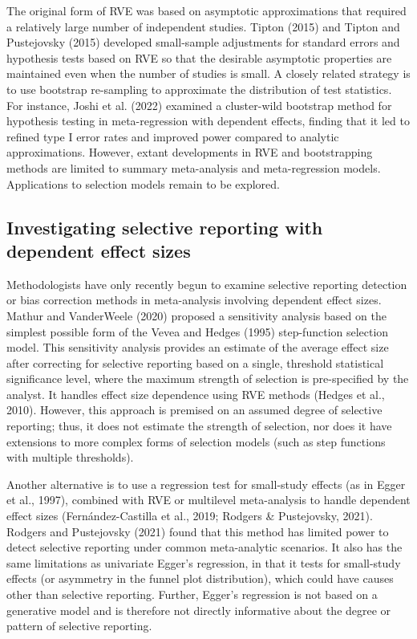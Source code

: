 \documentclass[
  man, donotrepeattitle,floatsintext]{apa7}
\begin{document}
The original form of RVE was based on asymptotic approximations that required a relatively large number of independent studies.
Tipton (2015) and Tipton and Pustejovsky (2015) developed small-sample adjustments for standard errors and hypothesis tests based on RVE so that the desirable asymptotic properties are maintained even when the number of studies is small.
A closely related strategy is to use bootstrap re-sampling to approximate the distribution of test statistics.
For instance, Joshi et al. (2022) examined a cluster-wild bootstrap method for hypothesis testing in meta-regression with dependent effects, finding that it led to refined type I error rates and improved power compared to analytic approximations.
However, extant developments in RVE and bootstrapping methods are limited to summary meta-analysis and meta-regression models.
Applications to selection models remain to be explored.

\subsection{Investigating selective reporting with dependent effect sizes}\label{investigating-selective-reporting-with-dependent-effect-sizes}

Methodologists have only recently begun to examine selective reporting detection or bias correction methods in meta-analysis involving dependent effect sizes.
Mathur and VanderWeele (2020) proposed a sensitivity analysis based on the simplest possible form of the Vevea and Hedges (1995) step-function selection model.
This sensitivity analysis provides an estimate of the average effect size after correcting for selective reporting based on a single, threshold statistical significance level, where the maximum strength of selection is pre-specified by the analyst. It handles effect size dependence using RVE methods (Hedges et al., 2010).
However, this approach is premised on an assumed degree of selective reporting; thus, it does not estimate the strength of selection, nor does it have extensions to more complex forms of selection models (such as step functions with multiple thresholds).

Another alternative is to use a regression test for small-study effects (as in Egger et al., 1997), combined with RVE or multilevel meta-analysis to handle dependent effect sizes (Fernández-Castilla et al., 2019; Rodgers \& Pustejovsky, 2021).
Rodgers and Pustejovsky (2021) found that this method has limited power to detect selective reporting under common meta-analytic scenarios.
It also has the same limitations as univariate Egger's regression, in that it tests for small-study effects (or asymmetry in the funnel plot distribution), which could have causes other than selective reporting.
Further, Egger's regression is not based on a generative model and is therefore not directly informative about the degree or pattern of selective reporting.
\end{document}
